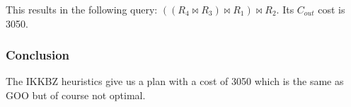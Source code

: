 \documentclass{scrartcl}
\newcommand{\join}{\Join}
\begin{document}
This results in the following query: $((R_4 \join R_3) \join R_1) \join R_2$.
Its $C_{out}$ cost is 3050.

\subsubsection*{Conclusion}

The IKKBZ heuristics give us a plan with a cost of 3050 which is the same as
GOO but of course not optimal.
\end{document}
